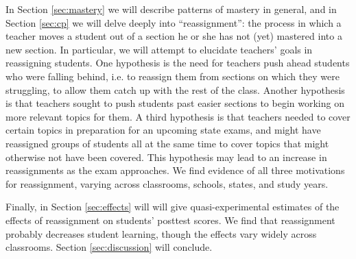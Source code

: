 \documentclass[12pt]{article}\usepackage[]{graphicx}\usepackage[]{color}
\begin{document}
In Section \ref{sec:mastery} we will describe patterns of mastery in general,
and in Section \ref{sec:cp} we will delve deeply into ``reassignment'': the process in which a
teacher moves a student out of a section he or she has not (yet)
mastered into a new section.
In particular, we will attempt to elucidate teachers' goals in reassigning students. One hypothesis is the need for teachers push ahead students who were falling behind, i.e. to reassign them from sections on which they were struggling, to allow them catch up with the rest of the class. Another hypothesis is that teachers sought to push students past easier sections to begin working on more relevant topics for them. A third hypothesis is that teachers needed to cover certain topics in preparation for an upcoming state exams, and might have reassigned groups of students all at the same time to cover topics that might otherwise not have been covered. This hypothesis may lead to an increase in reassignments as the exam approaches.
We find evidence of all three motivations for reassignment, varying
across classrooms, schools, states, and study  years.

Finally, in Section \ref{sec:effects} will will give
quasi-experimental estimates of the effects of reassignment on
students' posttest scores.
We find that reassignment probably decreases student learning,
though the effects vary widely across classrooms.
Section \ref{sec:discussion} will conclude.
\end{document}
